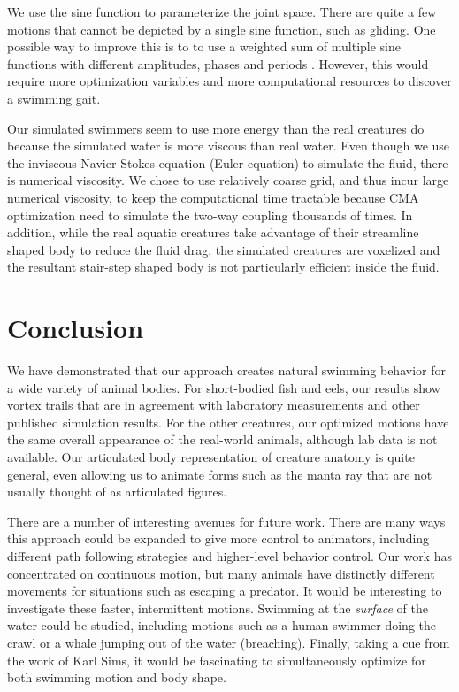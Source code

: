 We use the sine function to parameterize the joint space. There
are quite a few motions that cannot be depicted by a single sine function,
such as gliding. One possible way to improve this is to to use a weighted
sum of multiple sine functions with different amplitudes, phases and
periods \cite{Grzeszczuk95automatedlearning}. However, this would require more
optimization variables and more computational resources to discover a
swimming gait.

Our simulated swimmers seem to use more energy than the real creatures do because the simulated water is more viscous than real water. Even though we use the inviscous Navier-Stokes equation (Euler equation) to simulate the fluid, there is numerical viscosity. We chose to use relatively coarse grid, and thus incur large numerical viscosity, to keep the computational time tractable because CMA optimization need to simulate the two-way coupling thousands of times. In addition, while the real aquatic creatures take advantage of their streamline shaped body to reduce the fluid drag, the simulated creatures are voxelized and the resultant stair-step shaped body is not particularly efficient inside the fluid.


\section{Conclusion}

We have demonstrated that our approach creates natural swimming behavior for
a wide variety of animal bodies.  For short-bodied fish and eels, our
results show vortex trails that are in agreement with laboratory
measurements and other published simulation results.  For the other
creatures, our optimized motions have the same overall appearance of the
real-world animals, although lab data is not available.  Our articulated
body representation of creature anatomy is quite general, even allowing us to
animate forms such as the manta ray that are not usually thought of as
articulated figures.

There are a number of interesting avenues for future work.  There are many
ways this approach could be expanded to give more control to animators,
including different path following strategies and higher-level behavior
control.  Our work has concentrated on continuous motion, but many animals
have distinctly different movements for situations such as escaping a
predator.  It would be interesting to investigate these faster, intermittent
motions.  Swimming at the \emph{surface} of the water could be studied,
including motions such as a human swimmer doing the crawl or a whale jumping
out of the water (breaching).  Finally, taking a cue from the work of Karl
Sims, it would be fascinating to simultaneously optimize for both swimming
motion and body shape.
